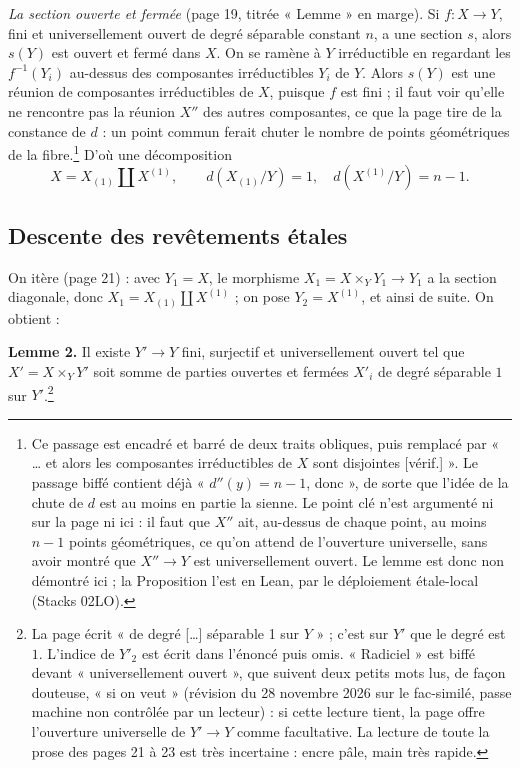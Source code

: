 \documentclass[11pt,a4paper]{article}
\begin{document}
\emph{La section ouverte et fermée} (page 19, titrée « Lemme » en marge). Si $f : X \to Y$, fini et
universellement ouvert de degré séparable constant $n$, a une section $s$,
alors $s(Y)$ est ouvert et fermé dans $X$. On se ramène à $Y$ irréductible en
regardant les $f^{-1}(Y_i)$ au-dessus des composantes irréductibles $Y_i$ de
$Y$. Alors $s(Y)$ est une réunion de composantes irréductibles de $X$, puisque
$f$ est fini ; il faut voir qu'elle ne rencontre pas la réunion $X''$ des
autres composantes, ce que la page tire de la constance de $d$ : un point
commun ferait chuter le nombre de points géométriques de la
fibre.\footnote{Ce passage est encadré et barré de deux traits obliques, puis
remplacé par « … et alors les composantes irréductibles de $X$ sont
disjointes [vérif.] ». Le passage biffé contient déjà « $d''(y) = n - 1$,
donc », de sorte que l'idée de la chute de $d$ est au moins en partie la
sienne. Le point clé n'est argumenté ni sur la page ni ici : il faut que $X''$
ait, au-dessus de chaque point, au moins $n - 1$ points géométriques, ce
qu'on attend de l'ouverture universelle, sans avoir montré que $X'' \to Y$
est universellement ouvert. Le lemme est donc non démontré ici ; la
Proposition l'est en Lean, par le déploiement étale-local (Stacks 02LO).} D'où une décomposition
\[
  X = X_{(1)} \amalg X^{(1)}, \qquad d(X_{(1)}/Y) = 1, \quad d(X^{(1)}/Y) = n - 1 .
\]

\subsection*{Descente des revêtements étales}

On itère (page 21) : avec $Y_1 = X$, le morphisme $X_1 = X \times_Y Y_1 \to
Y_1$ a la section diagonale, donc $X_1 = X_{(1)} \amalg X^{(1)}$ ; on pose
$Y_2 = X^{(1)}$, et ainsi de suite. On obtient :

\textbf{Lemme 2.} Il existe $Y' \to Y$ fini, surjectif et universellement
ouvert tel que $X' = X \times_Y Y'$ soit somme de parties ouvertes et fermées
$X'_i$ de degré séparable $1$ sur $Y'$.\footnote{La page écrit « de degré […]
séparable 1 sur $Y$ » ; c'est sur $Y'$ que le degré est $1$. L'indice de
$Y'_2$ est écrit dans l'énoncé puis omis. « Radiciel » est biffé devant
« universellement ouvert », que suivent deux petits mots lus, de façon
douteuse, « si on veut » (révision du 28 novembre 2026 sur le fac-similé, passe machine non contrôlée par un lecteur) : si cette lecture tient, la page offre
l'ouverture universelle de $Y' \to Y$ comme facultative. La lecture de toute la prose des pages 21 à 23
est très incertaine : encre pâle, main très rapide.}
\end{document}

